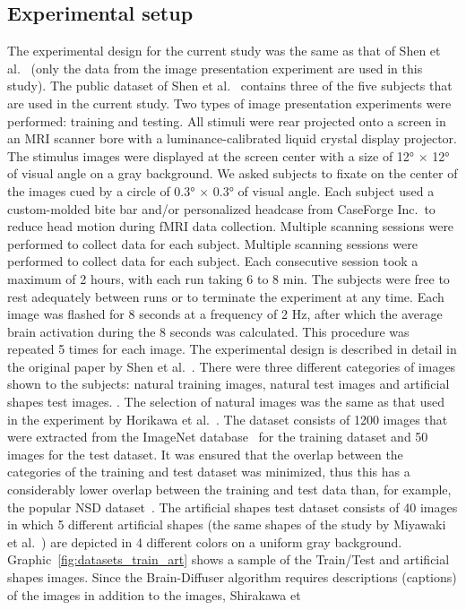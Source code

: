 \subsection{Experimental setup}
The experimental design for the current study was the same as that of Shen et al.~\cite{shenDeepImageReconstruction2019} (only the data from the image presentation experiment are used in this study). The public dataset of Shen et al.~\cite{ds001506:1.3.1} contains three of the five subjects that are used in the current study.  Two types of image presentation experiments were performed: training and testing. All stimuli were rear projected onto a screen in an MRI scanner bore with a luminance-calibrated liquid crystal display projector. The stimulus images were displayed at the screen center with a size of 12° $\times$ 12° of visual angle on a gray background. We asked subjects to fixate on the center of the images cued by a circle of 0.3° $\times$ 0.3° of visual angle. Each subject used a custom-molded bite bar and/or personalized headcase from CaseForge Inc.\ to reduce head motion during fMRI data collection. Multiple scanning sessions were performed to collect data for each subject. Multiple scanning sessions were performed to collect data for each subject. Each consecutive session took a maximum of 2 hours, with each run taking 6 to 8 min. The subjects were free to rest adequately between runs or to terminate the experiment at any time. Each image was flashed for 8 seconds at a frequency of 2 Hz, after which the average brain activation during the 8 seconds was calculated. This procedure was repeated 5 times for each image. The experimental design is described in detail in the original paper by Shen et al.~\cite{shenDeepImageReconstruction2019}. There were three different categories of images shown to the subjects: natural training images, natural test images and artificial shapes test images. . The selection of natural images was the same as that used in the experiment by Horikawa et al.~\cite{horikawaGenericDecodingSeen2017}. The dataset consists of 1200 images that were extracted from the ImageNet database~\cite{dengImageNetLargescaleHierarchical2009} for the training dataset and 50 images for the test dataset. It was ensured that the overlap between the categories of the training and test dataset was minimized, thus this  has a considerably lower overlap between the training and test data than, for example, the popular NSD dataset~\cite{allenMassive7TFMRI2022,shirakawaSpuriousReconstructionBrain2024}. The artificial shapes test dataset consists of 40 images in which 5 different artificial shapes (the same shapes of the study by Miyawaki et al.~\cite{miyawakiVisualImageReconstruction2008}) are depicted in 4 different colors on a uniform gray background. Graphic~\ref{fig:datasets_train_art} shows a sample of the Train/Test and artificial shapes images. Since the Brain-Diffuser algorithm requires descriptions (captions) of the images in addition to the images, Shirakawa et 